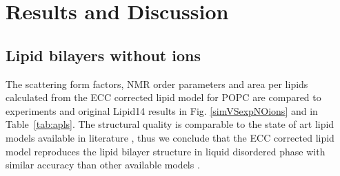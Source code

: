 \documentclass[aip,jcp,twocolumn]{revtex4}
\begin{document}
\section{Results and Discussion}

\subsection{Lipid bilayers without ions}
The scattering form factors, NMR order parameters and area per lipids calculated from 
the ECC corrected lipid model for POPC are compared to experiments and original
Lipid14 results in Fig. \ref{simVSexpNOions} and in Table~\ref{tab:apls}. 
The structural quality is comparable to the state of art lipid models available in literature \cite{ollila16},
thus we conclude that the ECC corrected lipid model reproduces the lipid bilayer structure
in liquid disordered phase with similar accuracy than other available models
.
\end{document}
